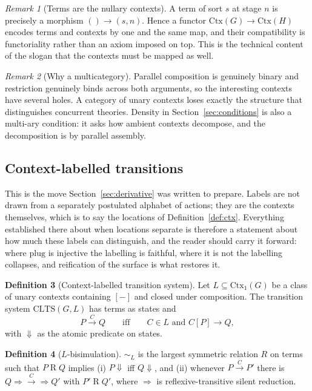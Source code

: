 \documentclass[11pt,a4paper]{article}
\theoremstyle{definition}
\newtheorem{definition}{Definition}[section]
\theoremstyle{plain}
\theoremstyle{remark}
\newtheorem{remark}[definition]{Remark}
\newcommand{\Ctx}{\mathrm{Ctx}}
\newcommand{\hole}{[-]}
\newcommand{\obs}{\Downarrow}
\begin{document}
\begin{remark}[Terms are the nullary contexts]
\label{rem:nullary}
A term of sort $s$ at stage $n$ is precisely a morphism $() \to (s,n)$. Hence a
functor $\Ctx(G) \to \Ctx(H)$ encodes terms and contexts by one and the same map,
and their compatibility is functoriality rather than an axiom imposed on top. This
is the technical content of the slogan that the contexts must be mapped as well.
\end{remark}

\begin{remark}[Why a multicategory]
\label{rem:multi}
Parallel composition is genuinely binary and restriction genuinely binds across both
arguments, so the interesting contexts have several holes. A category of unary
contexts loses exactly the structure that distinguishes concurrent theories. Density
in Section~\ref{sec:conditions} is also a multi-ary condition: it asks how ambient
contexts decompose, and the decomposition is by parallel assembly.
\end{remark}

\subsection{Context-labelled transitions}
\label{sec:clts}

This is the move Section~\ref{sec:derivative} was written to prepare. Labels are not
drawn from a separately postulated alphabet of actions; they are the contexts
themselves, which is to say the locations of Definition~\ref{def:ctx}. Everything
established there about when locations separate is therefore a statement about how
much these labels can distinguish, and the reader should carry it forward:
where $\mathrm{plug}$ is injective the labelling is faithful, where it is not the
labelling collapses, and reification of the surface is what restores it.

\begin{definition}[Context-labelled transition system]
\label{def:clts}
Let $L \subseteq \Ctx_1(G)$ be a class of unary contexts containing $\hole$ and
closed under composition. The transition system $\mathrm{CLTS}(G,L)$ has terms as
states and
\[
P \xrightarrow{\;C\;} Q
\qquad\text{iff}\qquad
C \in L \text{ and } C[P] \to Q,
\]
with $\obs$ as the atomic predicate on states.
\end{definition}

\begin{definition}[$L$-bisimulation]
$\sim_L$ is the largest symmetric relation $R$ on terms such that $P \mathbin{R} Q$
implies (i) $P \obs$ iff $Q \obs$, and (ii) whenever $P \xrightarrow{C} P'$ there is
$Q \Rightarrow \xrightarrow{C} \Rightarrow Q'$ with $P' \mathbin{R} Q'$, where
$\Rightarrow$ is reflexive-transitive silent reduction.
\end{definition}
\end{document}
